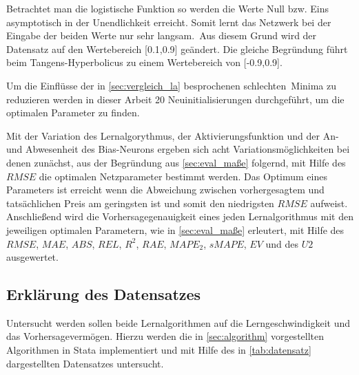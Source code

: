 Betrachtet man die logistische Funktion so werden die Werte Null bzw. Eins asymptotisch in der Unendlichkeit erreicht. Somit lernt das Netzwerk bei der Eingabe der beiden Werte nur sehr langsam.\, Aus diesem Grund wird der Datensatz auf den Wertebereich [0.1,0.9] geändert. Die gleiche Begründung führt beim Tangens-Hyperbolicus zu einem Wertebereich von [-0.9,0.9].

Um die Einflüsse der in \autoref{sec:vergleich_la} besprochenen \glqq schlechten\grqq~Minima zu reduzieren werden in dieser Arbeit 20 Neuinitialisierungen durchgeführt, um die optimalen Parameter zu finden.

Mit der Variation des Lernalgorythmus, der Aktivierungsfunktion und der An- und Abwesenheit des Bias-Neurons ergeben sich acht Variationsmöglichkeiten bei denen zunächst, aus der Begründung aus \autoref{sec:eval_maße} folgernd, mit Hilfe des $RMSE$ die optimalen Netzparameter bestimmt werden. Das Optimum eines Parameters ist erreicht wenn die Abweichung zwischen vorhergesagtem und tatsächlichen Preis am geringsten ist und somit den niedrigsten $RMSE$ aufweist. Anschließend wird die Vorhersagegenauigkeit eines jeden Lernalgorithmus mit den jeweiligen optimalen Parametern, wie in \autoref{sec:eval_maße} erleutert, mit Hilfe des $RMSE$, $MAE$, $ABS$, $REL$, $R^2$, $RAE$, $MAPE_2$, $sMAPE$, $EV$ und des $U2$ ausgewertet.

\subsection{Erklärung des Datensatzes}\label{sec:datensatz}

Untersucht werden sollen beide Lernalgorithmen auf die Lerngeschwindigkeit und das Vorhersagevermögen. Hierzu werden die in \autoref{sec:algorithm} vorgestellten Algorithmen in Stata implementiert und mit Hilfe des in \autoref{tab:datensatz} dargestellten Datensatzes untersucht.

